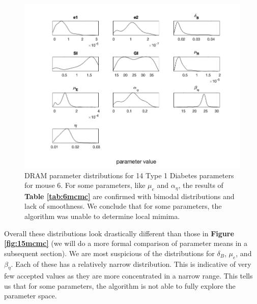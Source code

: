 \documentclass{article}
\begin{document}
\begin{figure}[H]
    \centering
    \includegraphics[width=15cm]{MCMC_figs/dram_t1d_final/jul10_mouse6_run1(noIC)_acute_NOD_waveOn_lietal_den.png}
    \caption{DRAM parameter distributions for 14 Type 1 Diabetes parameters for mouse 6. For some parameters, like $\mu_e$ and $\alpha_\eta$, the results of \textbf{Table \ref{tab:6mcmc}} are confirmed with bimodal distributions and lack of smoothness. We conclude that for some parameters, the algorithm was unable to determine local mimima.}
    \label{fig:19mcmc}
\end{figure}
Overall these distributions look drastically different than those in \textbf{Figure \ref{fig:15mcmc} }(we will do a more formal comparison of parameter means in a subsequent section). We are most suspicious of the distributions for $\delta_B$, $\mu_e$, and $\beta_{\eta}$. Each of these has a relatively narrow distribution. This is indicative of very few accepted values as they are more concentrated in a narrow range. This tells us that for some parameters, the algorithm is not able to fully explore the parameter space.
\end{document}
